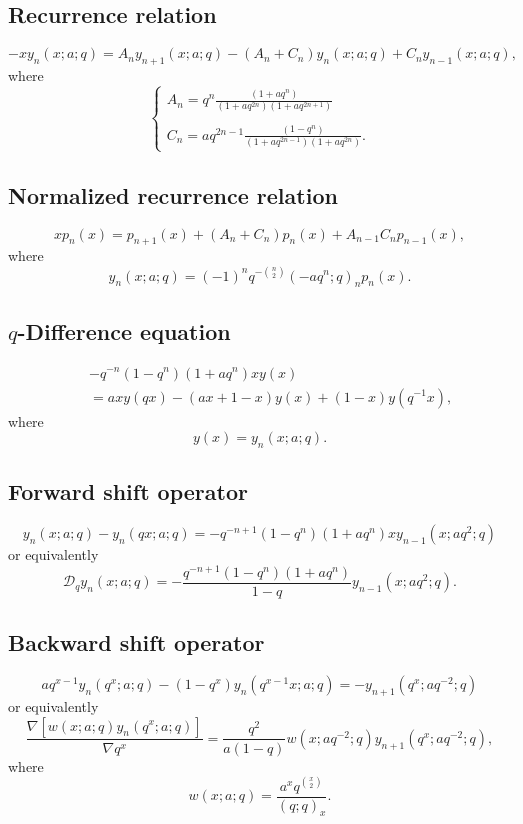\documentclass[envcountchap,graybox]{svmono}
\begin{document}
{{\subsection*{Recurrence relation}
\begin{equation}
\label{RecqBessel}
-xy_n(x;a;q)=A_ny_{n+1}(x;a;q)-(A_n+C_n)y_n(x;a;q)+C_ny_{n-1}(x;a;q),
\end{equation}
where
$$\left\{\begin{array}{l}\displaystyle A_n=q^n\frac{(1+aq^n)}{(1+aq^{2n})(1+aq^{2n+1})}\\
\\
\displaystyle C_n=aq^{2n-1}\frac{(1-q^n)}{(1+aq^{2n-1})(1+aq^{2n})}.\end{array}\right.$$

\subsection*{Normalized recurrence relation}
\begin{equation}
\label{NormRecqBessel}
xp_n(x)=p_{n+1}(x)+(A_n+C_n)p_n(x)+A_{n-1}C_np_{n-1}(x),
\end{equation}
where
$$y_n(x;a;q)=(-1)^nq^{-\binom{n}{2}}(-aq^n;q)_np_n(x).$$

\subsection*{$q$-Difference equation}
\begin{eqnarray}
\label{dvqBessel}
& &-q^{-n}(1-q^n)(1+aq^n)xy(x)\nonumber\\
& &{}=axy(qx)-(ax+1-x)y(x)+(1-x)y(q^{-1}x),
\end{eqnarray}
where
$$y(x)=y_n(x;a;q).$$

\newpage

\subsection*{Forward shift operator}
\begin{equation}
\label{shift1qBesselI}
y_n(x;a;q)-y_n(qx;a;q)=-q^{-n+1}(1-q^n)(1+aq^n)xy_{n-1}(x;aq^2;q)
\end{equation}
or equivalently
\begin{equation}
\label{shift1qBesselII}
\mathcal{D}_qy_n(x;a;q)=-\frac{q^{-n+1}(1-q^n)(1+aq^n)}{1-q}y_{n-1}(x;aq^2;q).
\end{equation}

\subsection*{Backward shift operator}
\begin{equation}
\label{shift2qBesselI}
aq^{x-1}y_n(q^x;a;q)-(1-q^x)y_n(q^{x-1}x;a;q)=-y_{n+1}(q^x;aq^{-2};q)
\end{equation}
or equivalently
\begin{equation}
\label{shift2qBesselII}
\frac{\nabla\left[w(x;a;q)y_n(q^x;a;q)\right]}{\nabla q^x}=
\frac{q^2}{a(1-q)}w(x;aq^{-2};q)y_{n+1}(q^x;aq^{-2};q),
\end{equation}
where
$$w(x;a;q)=\frac{a^xq^{\binom{x}{2}}}{(q;q)_x}.$$

}}
\end{document}

